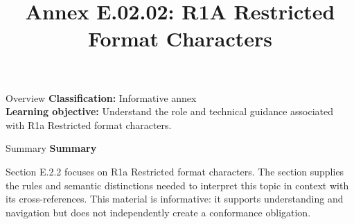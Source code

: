 \documentclass[10pt,letterpaper]{article}
\title{Annex E.02.02: R1A Restricted Format Characters}
\author{}
\date{}
\begin{document}
\maketitle
\begin{CornellOverviewBox}{Overview}
\textbf{Classification:} Informative annex\\[2pt]
\textbf{Learning objective:} Understand the role and technical guidance associated with R1a Restricted format characters.
\end{CornellOverviewBox}\begin{CornellSummaryBox}{Summary}
{\sffamily\bfseries\color{Accent} Summary}\par\vspace{3pt}Section E.2.2 focuses on R1a Restricted format characters. The section supplies the rules and semantic distinctions needed to interpret this topic in context with its cross-references. This material is informative: it supports understanding and navigation but does not independently create a conformance obligation.
\end{CornellSummaryBox}
\end{document}
